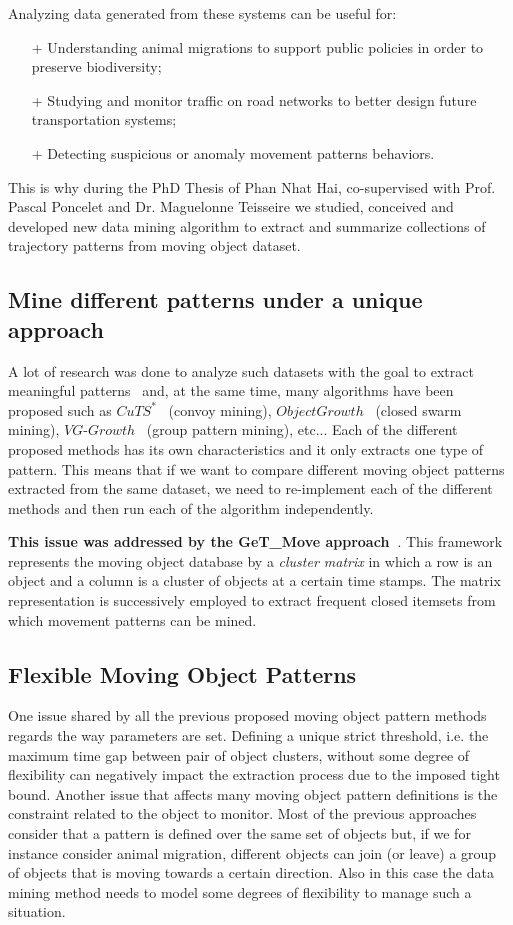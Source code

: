 Analyzing data generated from these systems can be useful for:
\begin{itemize}
\item [+] Understanding animal migrations to support public policies in order to preserve biodiversity;
\item [+] Studying and monitor traffic on road networks to better design future transportation systems; 
\item [+] Detecting suspicious or anomaly movement patterns behaviors. 
\end{itemize}

This is why during the PhD Thesis of Phan Nhat Hai, co-supervised with Prof. Pascal Poncelet and Dr. Maguelonne Teisseire we studied, conceived and developed new data mining algorithm to extract and summarize collections of trajectory patterns from moving object dataset.

\subsection{Mine different patterns under a unique approach}
A lot of research was done to analyze such datasets with the goal to extract meaningful patterns~\cite{Han2010} and, at the same time, many algorithms have been proposed such as $CuTS^*$~\cite{Jeung2008} (convoy mining), $ObjectGrowth$~\cite{Li2010} (closed swarm mining), $VG$-$Growth$~\cite{Wang2006} (group pattern mining), etc...
Each of the different proposed methods has its own characteristics and it only extracts one type of pattern. This means that if we want to compare different moving object patterns extracted from the same dataset, we need to re-implement each of the different methods and then run each of the algorithm independently. 

\textbf{This issue was addressed by the {\sc GeT\_Move} approach~\cite{HaiIPT12ep}}. This framework represents the moving object database by a \textit{cluster matrix} in which a row is an object and a column is a cluster of objects at a certain time stamps.
The matrix representation is successively employed to extract frequent closed itemsets from which movement patterns can be mined.

\subsection{Flexible Moving Object Patterns}

One issue shared by all the previous proposed moving object pattern methods regards the way parameters are set. Defining a unique strict threshold, i.e. the maximum time gap between pair of object clusters, without some degree of flexibility can negatively impact the extraction process due to the imposed tight bound.
Another issue that affects many moving object pattern definitions is the constraint related to the object to monitor. Most of the previous approaches~\cite{Han2010} consider that a pattern is defined over the same set of objects but, if we for instance consider animal migration, different objects can join (or leave) a group of objects that is moving towards a certain direction. Also in this case the data mining method needs to model some degrees of flexibility to manage such a situation.

